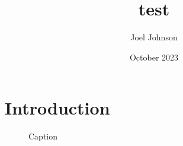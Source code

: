 \documentclass{article}
\title{test}
\author{Joel Johnson}
\date{October 2023}
\begin{document}
\maketitle

\section{Introduction}

\begin{figure}
    \centering
    \caption{Caption}
    \label{fig:my_label}
\end{figure}
\end{document}
